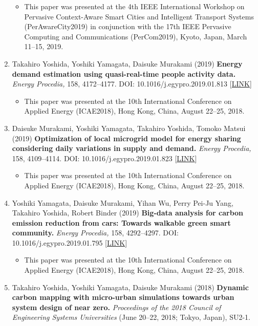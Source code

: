 \documentclass[
]{book}
\providecommand{\tightlist}{%
  \setlength{\itemsep}{0pt}\setlength{\parskip}{0pt}}
\begin{document}
\begin{enumerate}
  \begin{itemize}
  \tightlist
  \item
    This paper was presented at the 4th IEEE International Workshop on Pervasive Context-Aware Smart Cities and Intelligent Transport Systems (PerAwareCity2019) in conjunction with the 17th IEEE Pervasive Computing and Communications (PerCom2019), Kyoto, Japan, March 11--15, 2019.
  \end{itemize}
\item
  Takahiro Yoshida, Yoshiki Yamagata, Daisuke Murakami (2019)
  \textbf{Energy demand estimation using quasi-real-time people activity data.}
  \emph{Energy Procedia,} 158, 4172--4177.
  DOI: 10.1016/j.egypro.2019.01.813 {[}\href{https://www.sciencedirect.com/science/article/pii/S1876610219308537}{LINK}{]}

  \begin{itemize}
  \tightlist
  \item
    This paper was presented at the 10th International Conference on Applied Energy (ICAE2018), Hong Kong, China, August 22--25, 2018.
  \end{itemize}
\item
  Daisuke Murakami, Yoshiki Yamagata, Takahiro Yoshida, Tomoko Matsui (2019)
  \textbf{Optimization of local microgrid model for energy sharing considering daily variations in supply and demand.}
  \emph{Energy Procedia,} 158, 4109--4114.
  DOI: 10.1016/j.egypro.2019.01.823 {[}\href{https://www.sciencedirect.com/science/article/pii/S187661021930863X}{LINK}{]}

  \begin{itemize}
  \tightlist
  \item
    This paper was presented at the 10th International Conference on Applied Energy (ICAE2018), Hong Kong, China, August 22--25, 2018.
  \end{itemize}
\item
  Yoshiki Yamagata, Daisuke Murakami, Yihan Wu, Perry Pei-Ju Yang, Takahiro Yoshida, Robert Binder (2019)
  \textbf{Big-data analysis for carbon emission reduction from cars: Towards walkable green smart community.}
  \emph{Energy Procedia,} 158, 4292--4297.
  DOI: 10.1016/j.egypro.2019.01.795 {[}\href{https://www.sciencedirect.com/science/article/pii/S1876610219308331}{LINK}{]}

  \begin{itemize}
  \tightlist
  \item
    This paper was presented at the 10th International Conference on Applied Energy (ICAE2018), Hong Kong, China, August 22--25, 2018.
  \end{itemize}
\item
  Takahiro Yoshida, Yoshiki Yamagata, Daisuke Murakami (2018)
  \textbf{Dynamic carbon mapping with micro-urban simulations towards urban system design of near zero.}
  \emph{Proceedings of the 2018 Council of Engineering Systems Universities} (June 20--22, 2018; Tokyo, Japan), SU2-1.


\end{enumerate}
\end{document}
